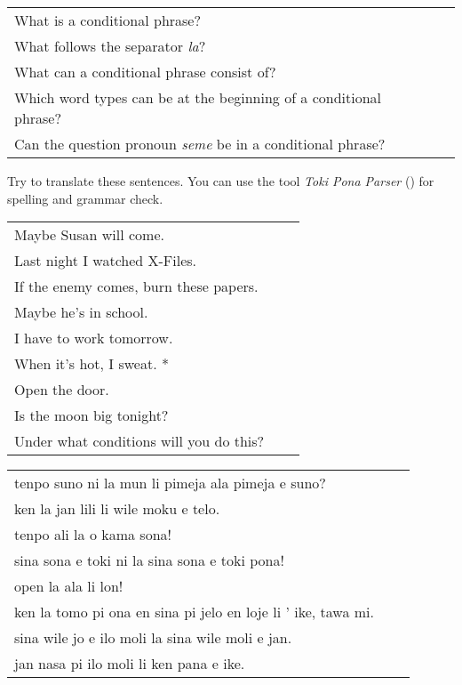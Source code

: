 \begin{supertabular}{p{5,5cm}|ll}
    What is a conditional phrase?                                      &  & \\  %
    What follows the separator \textit{la}?                            &  & \\  %
    What can a conditional phrase consist of?                          &  & \\  %
    Which word types can be at the beginning of a conditional phrase?  &  & \\  %
    Can the question pronoun \textit{seme} be in a conditional phrase? &  & \\  %
\end{supertabular}

Try to translate these sentences.
You can use the tool \textit{Toki Pona Parser} (\cite{www:rowa:02}) for spelling and grammar check.

\begin{supertabular}{p{5,5cm}|ll}
    Maybe Susan will come.                  &  & \\ %
    Last night I watched X-Files.           &  & \\ %
    If the enemy comes, burn these papers.  &  & \\ %
    Maybe he's in school.                   &  & \\ %
    I have to work tomorrow.                &  & \\ %
    When it's hot, I sweat. *               &  & \\ %
    Open the door.                          &  & \\ %
    Is the moon big tonight?                &  & \\ %
    Under what conditions will you do this? &  & \\ %
\end{supertabular}

\begin{supertabular}{p{5,5cm}|ll}
    tenpo suno ni la mun li pimeja ala pimeja e suno?             &  & \\ %
    ken la jan lili li wile moku e telo.                          &  & \\ %
    tenpo ali la o kama sona!                                     &  & \\ %
    sina sona e toki ni la sina sona e toki pona!                 &  & \\ %
    open la ala li lon!                                           &  & \\  %
    ken la tomo pi ona en sina pi jelo en loje li ' ike, tawa mi. &  & \\  %
    sina wile jo e ilo moli la sina wile moli e jan.              &  & \\  %
    jan nasa pi ilo moli li ken pana e ike.                       &  & \\ %
\end{supertabular}

